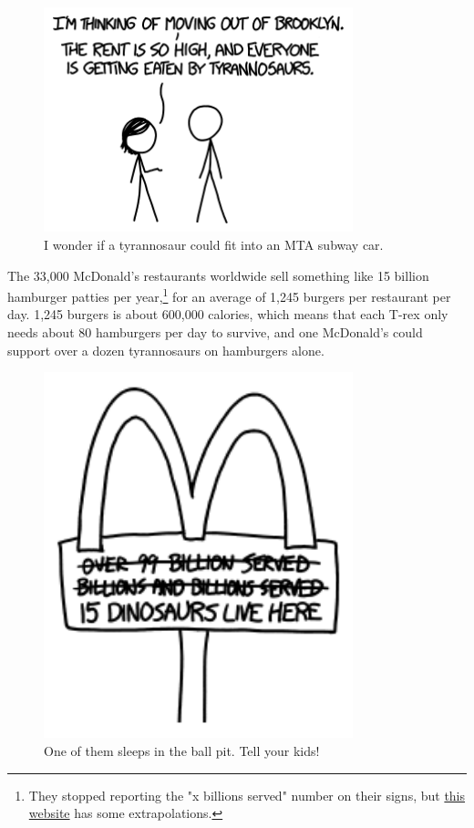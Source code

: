 {\begin{figure}[!htbp]
\centering
\includegraphics[scale=0.5, max width=0.8\textwidth]{imgs/a/78/trex_hipsters.png}
\caption{I wonder if a tyrannosaur could fit into an MTA subway car.}
\end{figure}

{The 33,000 McDonald's restaurants worldwide sell something like 15 billion hamburger patties per year,{\footnote{They stopped reporting the "x billions served" number on their signs, but \href{http://overhowmanybillionserved.blogspot.com/}{this website} has some extrapolations.} } for an average of 1,245 burgers per restaurant per day. 1,245 burgers is about 600,000 calories, which means that each T-rex only needs about 80 hamburgers per day to survive, and one McDonald's could support over a dozen tyrannosaurs on hamburgers alone.}

\begin{figure}[!htbp]
\centering
\includegraphics[scale=0.5, max width=0.8\textwidth]{imgs/a/78/trex_mcdonalds.png}
\caption{One of them sleeps in the ball pit. Tell your kids!}
\end{figure}

}
